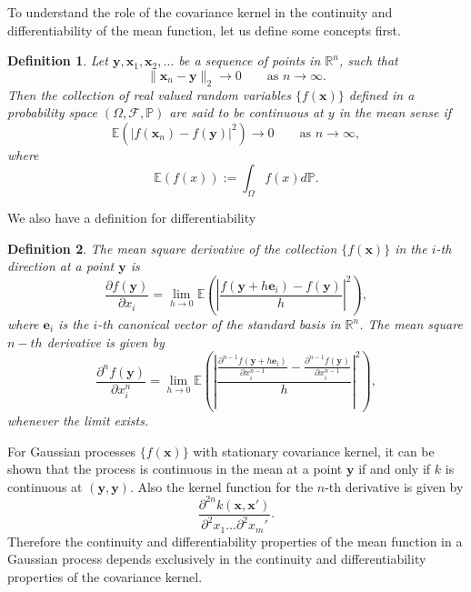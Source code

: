 \documentclass[12pt]{book}
\newtheorem{definition}{Definition}
\newcommand{\p}{\mathbb{P}}
\newcommand{\E}{\mathbb{E}} %
\newcommand{\x}{\textbf{x}}
\newcommand{\y}{\textbf{y}}
\begin{document}
To understand the role of the covariance kernel in the continuity and differentiability
 of the mean function, let us
define some concepts first. 
\begin{definition}
Let $\y,\x_{1},\x_{2},\ldots$ be a sequence of points in $\mathbb{R}^{n}$, such that 
\begin{equation*}
\|\x_{n}-\y\|_{2}\rightarrow 0\qquad\text{as }n\rightarrow\infty.
\end{equation*}
Then the collection of real valued random variables $\{f(\x)\}$ defined in a probability space
$(\Omega,\mathscr{F},\p)$ are said to be continuous at $y$ in the mean sense if 
\begin{equation*}
\E(|f(\x_{n})-f(\y)|^{2})\rightarrow 0\qquad\text{as } n\rightarrow\infty,
\end{equation*}
where
\begin{equation*}
\E(f(x)):=\int_{\Omega}f(x)d\p.
\end{equation*}
\end{definition}
We also have a definition for differentiability
\begin{definition}
The mean square derivative of the  collection $\{f(\x)\}$  in the $i$-th direction  at a point $\y$ is
\begin{equation*}
\frac{\partial f(\y)}{\partial x_{i}}=
\lim_{h\rightarrow 0}\E\left(\left|\frac{f(\y+h\textbf{e}_{i})-f(\y)}{h}\right|^{2}\right),
\end{equation*}
where $\textbf{e}_{i}$ is the $i$-th canonical vector of the standard basis in $\mathbb{R}^{n}$.
The mean square $n-th$ derivative is given by 
\begin{equation*}
\frac{\partial^{n} f(\y)}{\partial x_{i}^{n}}=
\lim_{h\rightarrow 0}\E\left(\left|\frac{\frac{\partial^{n-1}f(\y+h\textbf{e}_{i})}{\partial x_{i}^{n-1}}-
\frac{\partial^{n-1}f(\y)}{\partial x_{i}^{n-1}}}{h}\right|^{2}\right),
\end{equation*}
whenever the limit exists.
\end{definition}


For Gaussian processes $\{f(\x)\}$ with stationary covariance kernel, it can be shown that 
the process is continuous in the mean at a point $\y$ if and only if $k$ is continuous at $(\y,\y)$. 
Also the kernel function for the $n$-th derivative is given by \cite{adlergeometry}
\begin{equation*}
\frac{\partial^{2n}k(\x,\x')}{\partial^{2}x_{1}\ldots\partial^{2}x_{m}'}.
\end{equation*}
Therefore the continuity and differentiability properties of the mean function in a Gaussian process
depends exclusively in the continuity and differentiability properties of the covariance kernel.
\newline
\end{document}
